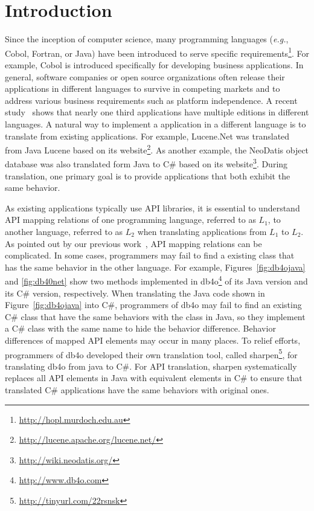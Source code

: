 \section{Introduction}
\label{sec:introduction}

Since the inception of computer science, many programming languages (\emph{e.g.}, Cobol, Fortran, or Java) have been introduced to serve specific requirements\footnote{\url{http://hopl.murdoch.edu.au}}. For example, Cobol is introduced specifically for developing business applications. In general, software companies or open source organizations often release their applications in different languages to survive in competing markets and to address various business requirements such as platform independence. A recent study~\cite{jones1998estimating} shows that nearly one third applications have multiple editions in different languages. A natural way to implement a application in a different language is to translate from existing applications. For example, Lucene.Net was translated from Java Lucene based on its website\footnote{\url{http://lucene.apache.org/lucene.net/}}. As another example, the NeoDatis object database was also translated form Java to C\# based on its website\footnote{\url{http://wiki.neodatis.org/}}. During translation, one primary goal is to provide applications that both exhibit the same behavior.


As existing applications typically use API libraries, it is essential to understand API mapping relations of one programming language, referred to as $L_1$, to another language, referred to as $L_2$ when translating applications from $L_1$ to $L_2$. As pointed out by our previous work~\cite{zhong2010mining}, API mapping relations can be complicated. In some cases, programmers may fail to find a existing class that has the same behavior in the other language. For example, Figures~\ref{fig:db4ojava} and \ref{fig:db40net} show two methods implemented in db4o\footnote{\url{http://www.db4o.com}} of its Java version and its C\# version, respectively. When translating the Java code shown in Figure~\ref{fig:db4ojava} into C\#, programmers of db4o may fail to find an existing C\# class that have the same behaviors with the  class in Java, so they implement a C\# class with the same name to hide the behavior difference. Behavior differences of mapped API elements may occur in many places. To relief efforts, programmers of db4o developed their own translation tool, called sharpen\footnote{\url{http://tinyurl.com/22rsnsk}}, for translating db4o from java to C\#. For API translation, sharpen systematically replaces all API elements in Java with equivalent elements in C\# to ensure that translated C\# applications have the same behaviors with original ones.

